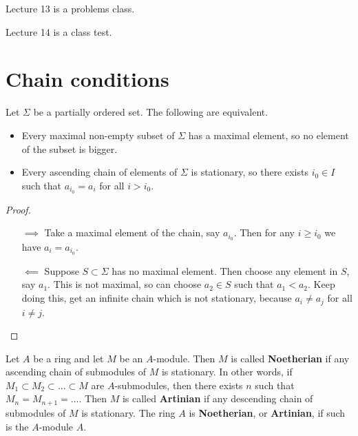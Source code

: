 
Lecture 13 is a problems class.


Lecture 14 is a class test.

\pagebreak

\section{Chain conditions}


\begin{lemma}
\label{lem:11.1}
Let $ \Sigma $ be a partially ordered set. The following are equivalent.
\begin{itemize}
\item Every maximal non-empty subset of $ \Sigma $ has a maximal element, so no element of the subset is bigger.
\item Every ascending chain of elements of $ \Sigma $ is stationary, so there exists $ i_0 \in I $ such that $ a_{i_0} = a_i $ for all $ i > i_0 $.
\end{itemize}
\end{lemma}

\begin{proof}
\hfill
\begin{enumerate}
\item[$ \implies $] Take a maximal element of the chain, say $ a_{i_0} $. Then for any $ i \ge i_0 $ we have $ a_i = a_{i_0} $.
\item[$ \impliedby $] Suppose $ S \subset \Sigma $ has no maximal element. Then choose any element in $ S $, say $ a_1 $. This is not maximal, so can choose $ a_2 \in S $ such that $ a_1 < a_2 $. Keep doing this, get an infinite chain which is not stationary, because $ a_i \ne a_j $ for all $ i \ne j $.
\end{enumerate}
\end{proof}

\begin{definition}
Let $ A $ be a ring and let $ M $ be an $ A $-module. Then $ M $ is called \textbf{Noetherian} if any ascending chain of submodules of $ M $ is stationary. In other words, if $ M_1 \subset M_2 \subset \dots \subset M $ are $ A $-submodules, then there exists $ n $ such that $ M_n = M_{n + 1} = \dots $. Then $ M $ is called \textbf{Artinian} if any descending chain of submodules of $ M $ is stationary. The ring $ A $ is \textbf{Noetherian}, or \textbf{Artinian}, if such is the $ A $-module $ A $.
\end{definition}

